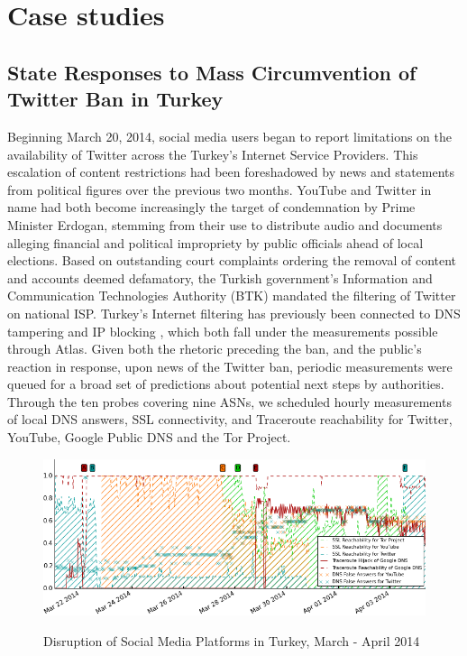 \section{Case studies}


\subsection{State Responses to Mass Circumvention of Twitter Ban in Turkey}

Beginning March 20, 2014, social media users began to report limitations on the availability of Twitter across the Turkey's Internet Service Providers. This escalation of content restrictions had been foreshadowed by news and statements from political figures over the previous two months. YouTube and Twitter in name had both become increasingly the target of condemnation by Prime Minister Erdogan, stemming from their use to distribute audio and documents alleging financial and political impropriety by public officials ahead of local elections. Based on outstanding court complaints ordering the removal of content and accounts deemed defamatory, the Turkish government's Information and Communication Technologies Authority (BTK) mandated the filtering of Twitter on national ISP. Turkey's Internet filtering has previously been connected to DNS tampering and IP blocking \cite{akdeniz2010report}, which both fall under the measurements possible through Atlas. Given both the rhetoric preceding the ban, and the public's reaction in response, upon news of the Twitter ban, periodic measurements were queued for a broad set of predictions about potential next steps by authorities. Through the ten probes covering nine ASNs, we scheduled hourly measurements of local DNS answers, SSL connectivity, and Traceroute reachability for Twitter, YouTube, Google Public DNS and the Tor Project.

\begin{figure}
  \includegraphics[width=\textwidth]{resources/tr-20140321-20140407-social_media_filtering.png}
  \label{image:tr-social_media_filtering}
  \caption{Disruption of Social Media Platforms in Turkey, March - April 2014}
\end{figure}

